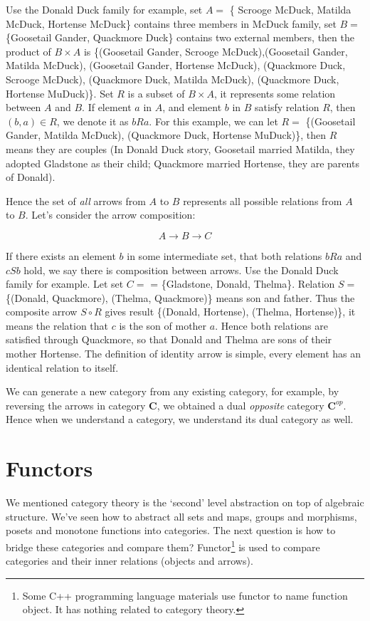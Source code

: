 \documentclass{article}
\begin{document}
Use the Donald Duck family for example, set $A =$ \{ Scrooge McDuck, Matilda McDuck, Hortense McDuck\} contains three members in McDuck family, set $B = $ \{Goosetail Gander, Quackmore Duck\} contains two external members, then the product of $B \times A$ is \{(Goosetail Gander, Scrooge McDuck),(Goosetail Gander, Matilda McDuck), (Goosetail Gander, Hortense McDuck), (Quackmore Duck, Scrooge McDuck), (Quackmore Duck, Matilda McDuck), (Quackmore Duck, Hortense MuDuck)\}. Set $R$ is a subset of $B \times A$, it represents some relation between $A$ and $B$. If element $a$ in $A$, and element $b$ in $B$ satisfy relation $R$, then $(b, a) \in R$, we denote it as $bRa$. For this example, we can let $R=$ \{(Goosetail Gander, Matilda McDuck), (Quackmore Duck, Hortense MuDuck)\}, then $R$ means they are couples (In Donald Duck story, Goosetail married Matilda, they adopted Gladstone as their child; Quackmore married Hortense, they are parents of Donald).

Hence the set of {\em all} arrows from $A$ to $B$ represents all possible relations from $A$ to $B$. Let's consider the arrow composition:

\[
A \to B \to C
\]

If there exists an element $b$ in some intermediate set, that both relations $bRa$ and $cSb$ hold, we say there is composition between arrows. Use the Donald Duck family for example. Let set $C=$ = \{Gladstone, Donald, Thelma\}. Relation $S=$ \{(Donald, Quackmore), (Thelma, Quackmore)\} means son and father. Thus the composite arrow $S \circ R$ gives result \{(Donald, Hortense), (Thelma, Hortense)\}, it means the relation that $c$ is the son of mother $a$. Hence both relations are satisfied through Quackmore, so that Donald and Thelma are sons of their mother Hortense. The definition of identity arrow is simple, every element has an identical relation to itself.

We can generate a new category from any existing category, for example, by reversing the arrows in category $\pmb{C}$, we obtained a dual {\em opposite} category $\pmb{C}^{op}$. Hence when we understand a category, we understand its dual category as well.

\section{Functors}

We mentioned category theory is the `second' level abstraction on top of algebraic structure. We've seen how to abstract all sets and maps, groups and morphisms, posets and monotone functions into categories. The next question is how to bridge these categories and compare them? Functor\footnote{Some C++ programming language materials use functor to name function object. It has nothing related to category theory.} is used to compare categories and their inner relations (objects and arrows).
\end{document}
